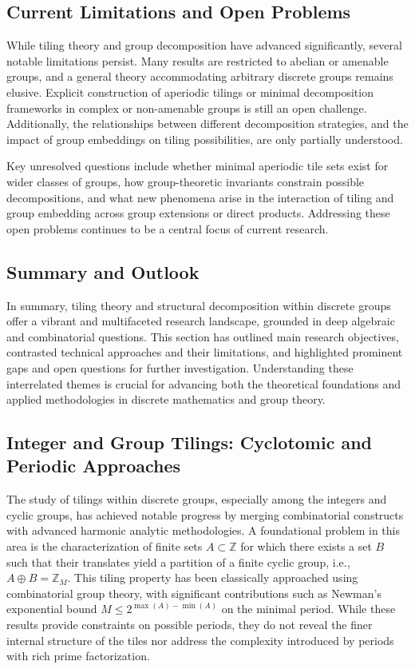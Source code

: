 \documentclass[sigconf]{acmart}
\begin{document}
\subsection*{Current Limitations and Open Problems}

While tiling theory and group decomposition have advanced significantly, several notable limitations persist. Many results are restricted to abelian or amenable groups, and a general theory accommodating arbitrary discrete groups remains elusive. Explicit construction of aperiodic tilings or minimal decomposition frameworks in complex or non-amenable groups is still an open challenge. Additionally, the relationships between different decomposition strategies, and the impact of group embeddings on tiling possibilities, are only partially understood.

Key unresolved questions include whether minimal aperiodic tile sets exist for wider classes of groups, how group-theoretic invariants constrain possible decompositions, and what new phenomena arise in the interaction of tiling and group embedding across group extensions or direct products. Addressing these open problems continues to be a central focus of current research.

\subsection*{Summary and Outlook}

In summary, tiling theory and structural decomposition within discrete groups offer a vibrant and multifaceted research landscape, grounded in deep algebraic and combinatorial questions. This section has outlined main research objectives, contrasted technical approaches and their limitations, and highlighted prominent gaps and open questions for further investigation. Understanding these interrelated themes is crucial for advancing both the theoretical foundations and applied methodologies in discrete mathematics and group theory.

\subsection{Integer and Group Tilings: Cyclotomic and Periodic Approaches}

The study of tilings within discrete groups, especially among the integers and cyclic groups, has achieved notable progress by merging combinatorial constructs with advanced harmonic analytic methodologies. A foundational problem in this area is the characterization of finite sets \( A \subset \mathbb{Z} \) for which there exists a set \( B \) such that their translates yield a partition of a finite cyclic group, i.e., \( A \oplus B = \mathbb{Z}_M \). This tiling property has been classically approached using combinatorial group theory, with significant contributions such as Newman's exponential bound \( M \leq 2^{\max(A)-\min(A)} \) on the minimal period. While these results provide constraints on possible periods, they do not reveal the finer internal structure of the tiles nor address the complexity introduced by periods with rich prime factorization.
\end{document}
